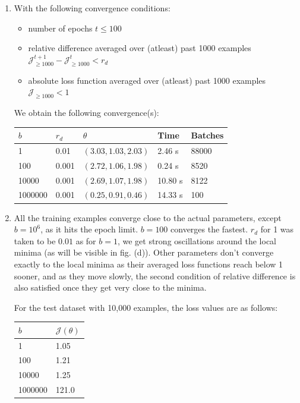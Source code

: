 \documentclass[12pt]{article}
\begin{document}
\begin{enumerate}[label=(\alph*)]
    \addtocounter{enumi}{1}
    \item With the following convergence conditions:
    \begin{itemize}
        \item number of epochs $t \le 100$
        \item relative difference averaged over (atleast) past 1000 examples $\mathcal{J}^{t+1}_{\ge 1000} - \mathcal{J}^{t}_{\ge 1000} < r_d$
        \item absolute loss function averaged over (atleast) past 1000 examples $\mathcal{J}_{\ge 1000} < 1$
    \end{itemize}

    We obtain the following convergence(s):

    \begin{center}
    \begin{tabular}{|l|l|l|l|l|}
        \hline
        $b$     & $r_d$ & $\theta$ & Time & Batches \\
        \hline
        1       & 0.01  & $(3.03,1.03,2.03)$ & 2.46 s & 88000 \\
        100     & 0.001 & $(2.72,1.06,1.98)$ & 0.24 s & 8520 \\
        10000   & 0.001 & $(2.69,1.07,1.98)$ & 10.80 s & 8122 \\
        1000000 & 0.001 & $(0.25,0.91,0.46)$ & 14.33 s & 100 \\
        \hline
    \end{tabular}
    \end{center}

    \item All the training examples converge close to the actual parameters, except $b=10^6$, as it hits the epoch limit. $b=100$ converges the fastest. $r_d$ for 1 was taken to be $0.01$ as for $b=1$, we get strong oscillations around the local minima (as will be visible in fig. (d)). Other parameters don't converge exactly to the local minima as their averaged loss functions reach below 1 sooner, and as they move slowly, the second condition of relative difference is also satisfied once they get very close to the minima. 

    For the test dataset with 10,000 examples, the loss values are as follows:

    \begin{center}
    \begin{tabular}{|l|l|}
        \hline
        $b$     & $\mathcal{J}(\theta)$ \\
        \hline
        1       & 1.05 \\
        100     & 1.21 \\
        10000   & 1.25 \\
        1000000 & 121.0 \\
        \hline
    \end{tabular}
    \end{center}


\end{enumerate}
\end{document}
